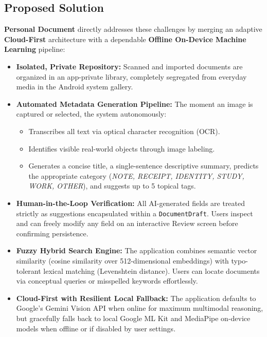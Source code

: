 \subsection{Proposed Solution}
\textbf{Personal Document} directly addresses these challenges by merging an adaptive \textbf{Cloud-First} architecture with a dependable \textbf{Offline On-Device Machine Learning} pipeline:
\begin{itemize}
    \item \textbf{Isolated, Private Repository:} Scanned and imported documents are organized in an app-private library, completely segregated from everyday media in the Android system gallery.
    \item \textbf{Automated Metadata Generation Pipeline:} The moment an image is captured or selected, the system autonomously:
    \begin{itemize}
        \item Transcribes all text via optical character recognition (OCR).
        \item Identifies visible real-world objects through image labeling.
        \item Generates a concise title, a single-sentence descriptive summary, predicts the appropriate category (\textit{NOTE, RECEIPT, IDENTITY, STUDY, WORK, OTHER}), and suggests up to 5 topical tags.
    \end{itemize}
    \item \textbf{Human-in-the-Loop Verification:} All AI-generated fields are treated strictly as suggestions encapsulated within a \texttt{DocumentDraft}. Users inspect and can freely modify any field on an interactive Review screen before confirming persistence.
    \item \textbf{Fuzzy Hybrid Search Engine:} The application combines semantic vector similarity (cosine similarity over 512-dimensional embeddings) with typo-tolerant lexical matching (Levenshtein distance). Users can locate documents via conceptual queries or misspelled keywords effortlessly.
    \item \textbf{Cloud-First with Resilient Local Fallback:} The application defaults to Google's Gemini Vision API when online for maximum multimodal reasoning, but gracefully falls back to local Google ML Kit and MediaPipe on-device models when offline or if disabled by user settings.
\end{itemize}
